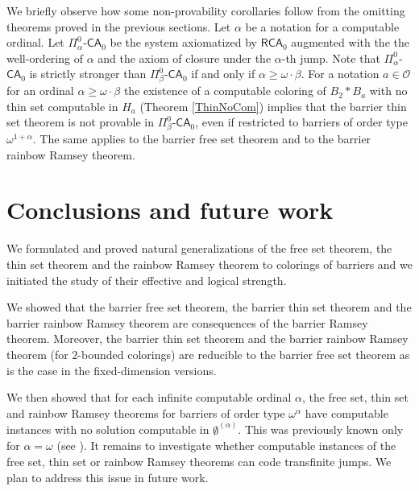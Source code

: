 \documentclass{amsart}
\theoremstyle{plain}
\theoremstyle{plain}
\newcommand{\om}{\omega}
\newcommand\RCA{\mathsf{RCA}}
\begin{document}
We briefly observe how some non-provability corollaries follow from the omitting theorems proved in the previous sections. Let $\alpha$ be a notation for a computable ordinal. Let $\Pi^0_\alpha$-$\mathsf{CA}_0$ be the system axiomatized by $\RCA_0$ augmented with 
the the well-ordering of $\alpha$ and the axiom of closure under the $\alpha$-th jump. Note that $\Pi^0_\alpha$-$\mathsf{CA}_0$ is strictly stronger than $\Pi^0_\beta$-$\mathsf{CA}_0$ if and only if $\alpha \geq \om\cdot \beta$. For a notation $a\in\mathcal{O}$ for an ordinal $\alpha\geq \om\cdot \beta$ the existence of a computable coloring of $B_2 * B_a$ with no thin set computable in ${H_a}$ (Theorem \ref{ThinNoCom}) implies that the barrier thin set theorem is not provable in $\Pi^0_\beta$-$\mathsf{CA}_0$, even if restricted to barriers of order type $\om^{1+\alpha}$. The same applies to the barrier free set theorem and to the barrier rainbow Ramsey theorem. 

\section{Conclusions and future work}

We formulated and proved natural generalizations of the free set theorem, the thin set theorem and the rainbow Ramsey theorem to colorings of barriers and we initiated the study of their effective and logical strength. 

We showed that the barrier free set theorem, the barrier thin set theorem and the barrier rainbow Ramsey theorem are consequences of the barrier Ramsey theorem. Moreover, the barrier thin set theorem and the barrier rainbow Ramsey theorem (for $2$-bounded colorings) are reducible to the barrier free set theorem as is the case in the fixed-dimension versions.  

We then showed that for each infinite computable ordinal $\alpha$, the free set, thin set and rainbow Ramsey theorems for barriers of order type $\om^{\alpha}$ have computable instances with no solution computable in $\emptyset^{(\alpha)}$. This was previously known only for $\alpha=\om$ (see \cite{carlucci2024ramseyliketheoremsschreierbarrier}). It remains to investigate whether computable instances of the free set, thin set or rainbow Ramsey theorems can code transfinite jumps. We plan to address this issue in future work. 




\end{document}
